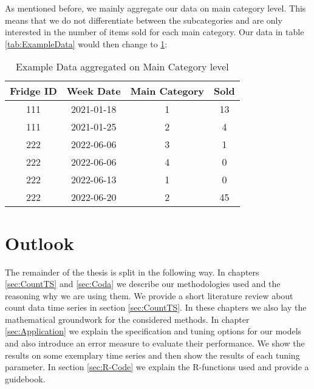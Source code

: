 As mentioned before, we mainly aggregate our data on main category level. This means that we do not differentiate between the subcategories and are only interested in the number of items sold for each main category. Our data in table \ref{tab:ExampleData} would then change to \ref{tab:ExampleData aggregated}:

\begin{table}[h!]
\centering
\begin{tabular}{cccc}
\hline
\rowcolor[HTML]{FFFFFF} 
\textbf{Fridge ID} & \textbf{Week Date} & \textbf{Main Category} & \textbf{Sold} \\ \hline
111                & 2021-01-18         & 1                      & 13             \\
111                & 2021-01-25         & 2                      & 4             \\
222                & 2022-06-06         & 3                      & 1             \\
222                & 2022-06-06         & 4                      & 0             \\
222                & 2022-06-13         & 1                      & 0             \\
222                & 2022-06-20         & 2                      & 45            \\ \hline
\end{tabular}
\caption{Example Data aggregated on Main Category level}
\label{tab:ExampleData aggregated}
\end{table}

\section{Outlook}
\label{sec: Outlook}

The remainder of the thesis is split in the following way. In chapters \ref{sec:CountTS} and \ref{sec:Coda} we describe our methodologies used and the reasoning why we are using them. We provide a short literature review about count data time series in section \ref{sec:CountTS}. In these chapters we also lay the mathematical groundwork for the considered methods. In chapter \ref{sec:Application} we explain the specification and tuning options for our models and also introduce an error measure to evaluate their performance. We show the results on some exemplary time series and then show the results of each tuning parameter. In section \ref{sec:R-Code} we explain the R-functions used and provide a guidebook.%